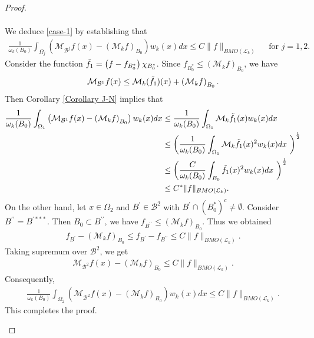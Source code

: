 \documentclass[11pt, reqno]{amsproc}
\theoremstyle{definition}
\theoremstyle{remark}
\numberwithin{equation}{section}
\begin{document}
\begin{proof}
\begin{enumerate}[$i)$]
\begin{align*}
    \end{align*}
We deduce \eqref{case-1} by establishing that 
\begin{align*} 
   \frac{1}{\omega_k(B_0)} \int_{\Omega_j} \left( \mathcal{M}_{\mathcal{B}^j}f(x) - \left( \mathcal{M}_kf\right)_{B_0} \right) w_k(x)dx \leq C \|f\|_{BMO(\mathcal{L}_k)} \quad \text{ for } j=1,2.
\end{align*}
Consider the function $\Tilde{f_1}= \left( f-f_{B_0^*}\right)\chi_{B_0^*}$.  Since  $f_{B_0^*} \leq \left(\mathcal{M}_{k}f\right)_{B_0} $, we have $$\mathcal{M}_{\mathcal{B}^1}f(x) \leq \mathcal{M}_k(\Tilde{f_1})(x)+\left(\mathcal{M}_{k}f\right)_{B_0}.$$ Then Corollary \ref{Corollary J-N} implies that
\begin{align*}
    \frac{1}{\omega_k(B_0)} \int_{\Omega_1} \left( \mathcal{M}_{\mathcal{B}^1}f(x) - \left( \mathcal{M}_kf\right)_{B_0} \right) w_k(x)dx 
    & \leq  \frac{1}{\omega_k(B_0)} \int_{\Omega_1} {\mathcal{M}_k}\Tilde{f_1}(x) w_k(x)dx \\
    & \leq \left( \frac{1}{\omega_k(B_0)} \int_{\Omega_1} {\mathcal{M}_k}\Tilde{f_1}(x)^2 w_k(x)dx \ \right)^{\frac{1}{2}}\\
    & \leq \left( \frac{C}{\omega_k(B_0)} \int_{B_0} \Tilde{f_1}(x)^2 w_k(x)dx \ \right)^{\frac{1}{2}} \\
    & \leq C^* \|f\|_{BMO(\mathcal{L}_k)}.
\end{align*} 
On the other hand, let $x\in \Omega_2$ and $B^\prime \in \mathcal{B}^2$ with $B^\prime \cap (B_0^*)^c \neq \emptyset$. Consider $B^{\prime\prime}=B^{\prime ***}$. Then  $B_0\subset B^{\prime\prime}$, we have $f_{B^{\prime\prime}} \leq \left(\mathcal{M}_kf\right)_{B_0}$. Thus we obtained 
\begin{align*}
    f_{B^\prime}-\left(\mathcal{M}_kf\right)_{B_0} \leq f_{B^\prime} - f_{B^{\prime\prime}} \leq C\|f\|_{BMO(\mathcal{L}_k)}.
\end{align*}
Taking supremum over $\mathcal{B}^2$, we get
\begin{align*}
    \mathcal{M}_{\mathcal{B}^2}f(x)- \left(\mathcal{M}_kf\right)_{B_0} \leq C\|f\|_{BMO(\mathcal{L}_k)}.
\end{align*} Consequently,
\begin{align*}
    \frac{1}{\omega_k(B_0)}\int_{\Omega_2} \left( \mathcal{M}_{\mathcal{B}^2}f(x) - \left( \mathcal{M}_kf\right)_{B_0} \right) w_k(x)dx \leq C \|f\|_{BMO(\mathcal{L}_k)}.
\end{align*}This completes the proof.
 \end{enumerate}
\end{proof}
\end{document}
